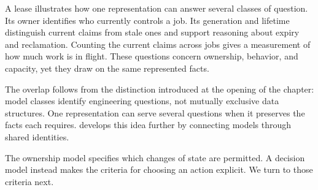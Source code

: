 A lease illustrates how one representation can answer several classes of question. Its owner identifies who currently controls a job. Its generation and lifetime distinguish current claims from stale ones and support reasoning about expiry and reclamation. Counting the current claims across jobs gives a measurement of how much work is in flight. These questions concern ownership, behavior, and capacity, yet they draw on the same represented facts.


The overlap follows from the distinction introduced at the opening of the chapter: model classes identify engineering questions, not mutually exclusive data structures. One representation can serve several questions when it preserves the facts each requires.  develops this idea further by connecting models through shared identities.

The ownership model specifies which changes of state are permitted. A decision model instead makes the criteria for choosing an action explicit. We turn to those criteria next.
